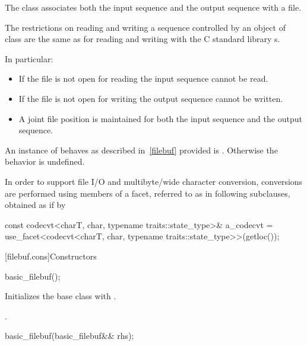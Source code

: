 \pnum
The class
associates both the input sequence and the output
sequence with a file.

\pnum
The restrictions on reading and writing a sequence controlled by an
object of class
are the same as for reading and writing with the C standard library
s.

\pnum
In particular:
\begin{itemize}
\item
If the file is not open for reading the input sequence
cannot be read.
\item
If the file is not open for writing the output
sequence cannot be written.
\item
A joint file position is maintained for both the input sequence and
the output sequence.
\end{itemize}

\pnum
An instance of
behaves as described in~\ref{filebuf} provided
is
.
Otherwise the behavior is undefined.

\pnum
In order to support file I/O and multibyte/wide character conversion,
conversions are performed using members of a facet, referred to as
 in following subclauses, obtained as if by
\begin{codeblock}
const codecvt<charT, char, typename traits::state_type>& a_codecvt =
  use_facet<codecvt<charT, char, typename traits::state_type>>(getloc());
\end{codeblock}

[filebuf.cons]{Constructors}

%
\begin{itemdecl}
basic_filebuf();
\end{itemdecl}

\begin{itemdescr}
\pnum
\effects
Initializes the base class with
.

\pnum
\ensures
{}.
\end{itemdescr}

%
\begin{itemdecl}
basic_filebuf(basic_filebuf&& rhs);
\end{itemdecl}

